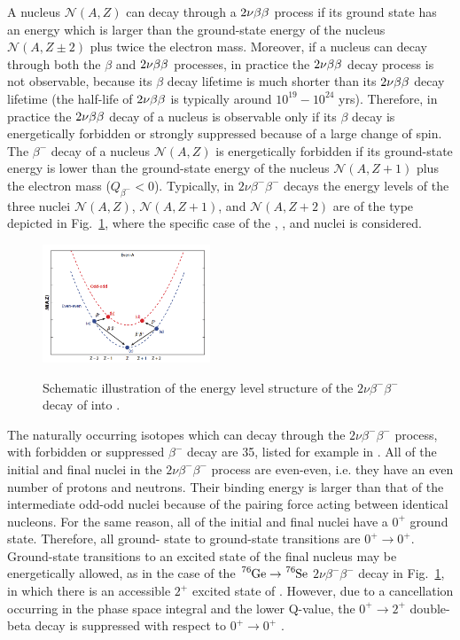 A nucleus $\mathcal{N}(A,Z)$ can decay through a $2\nu\beta\beta$ process if its ground state has an energy which is larger than the ground-state energy of the nucleus $\mathcal{N}(A,Z\pm2)$ plus twice the electron mass. Moreover, if a nucleus can decay through both the $\beta$ and $2\nu\beta\beta$ processes, in practice the $2\nu\beta\beta$ decay process is not observable, because its $\beta$ decay lifetime is much shorter than its $2\nu\beta\beta$ decay lifetime (the half-life of $2\nu\beta\beta$ is typically around $10^{19}-10^{24}$ yrs). Therefore, in practice the $2\nu\beta\beta$ decay of a nucleus is observable only if its $\beta$ decay is energetically forbidden or strongly suppressed because of a large change of spin. The $\beta^-$ decay of a nucleus $\mathcal{N}(A,Z)$ is energetically forbidden if its ground-state energy is lower than the ground-state energy of the nucleus $\mathcal{N}(A,Z+1)$ plus the electron mass ($Q_{\beta^{-}}<0$). Typically, in $2\nu\beta^-\beta^-$ decays the energy levels of the three nuclei $\mathcal{N}(A,Z)$, $\mathcal{N}(A,Z+1)$, and $\mathcal{N}(A,Z+2)$ are of the type depicted in Fig.~\ref{fig:levelsGe76}, where the specific case of the , , and  nuclei is considered.
\begin{figure}
\centering
	\subfigure
		{}
	\subfigure
		{\includegraphics[width=5cm]{img/masspar}}
	\caption{Schematic illustration of the energy level structure of the $2\nu\beta^-\beta^-$ decay of  into .}
	\label{fig:levelsGe76}
\end{figure}

The naturally occurring isotopes which can decay through the $2\nu\beta^-\beta^-$ process, with forbidden or suppressed $\beta^-$ decay are 35, listed for example in \cite{Giunti:2007ry}. All of the initial and final nuclei in the $2\nu\beta^-\beta^-$ process are even-even, i.e. they have an even number of protons and neutrons. Their binding energy is larger than that of the intermediate odd-odd nuclei because of the pairing force acting between identical nucleons. For the same reason, all of the initial and final nuclei have a $0^+$ ground state. Therefore, all ground- state to ground-state transitions are $0^+\rightarrow0^+$. Ground-state transitions to an excited state of the final nucleus may be energetically allowed, as in the case of the $\ce{^{76}Ge}\rightarrow\ce{^{76}Se}$ $2\nu\beta^-\beta^-$ decay in Fig.~\ref{fig:levelsGe76}, in which there is an accessible $2^+$ excited state of . However, due to a cancellation occurring in the phase space integral and the lower Q-value, the $0^+\rightarrow2^+$ double-beta decay is suppressed with respect to $0^+\rightarrow0^+$ \cite{Tomoda:1991}.

